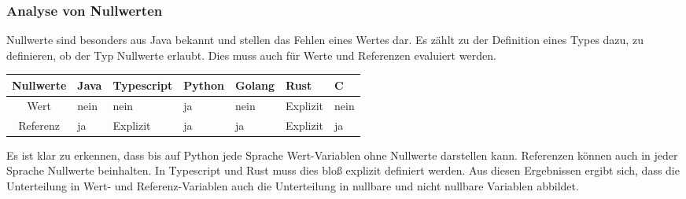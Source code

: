 \documentclass[./einleitung.tex]{subfiles}
\begin{document}
    \subsubsection{Analyse von Nullwerten}
    Nullwerte sind besonders aus Java bekannt und stellen das Fehlen eines Wertes dar.
    Es zählt zu der Definition eines Types dazu, zu definieren, ob der Typ Nullwerte erlaubt.
    Dies muss auch für Werte und Referenzen evaluiert werden.
    \begin{center}
        \begin{tabular}{| c || m{4em} | m{5em} | m{5em} | m{4.5em} | m{4.5em} | m{4.5em} |}
            \hline
            Nullwerte & Java & Typescript & Python & Golang & Rust     & C    \\
            \hline
            Wert      & nein & nein       & ja     & nein   & Explizit & nein \\
            \hline
            Referenz  & ja   & Explizit   & ja     & ja     & Explizit & ja   \\
            \hline
        \end{tabular}
    \end{center}
    Es ist klar zu erkennen, dass bis auf Python jede Sprache Wert-Variablen ohne Nullwerte darstellen kann.
    Referenzen können auch in jeder Sprache Nullwerte beinhalten.
    In Typescript und Rust muss dies bloß explizit definiert werden.
    Aus diesen Ergebnissen ergibt sich, dass die Unterteilung in Wert- und Referenz-Variablen auch die Unterteilung in nullbare und nicht nullbare Variablen abbildet.
\end{document}
